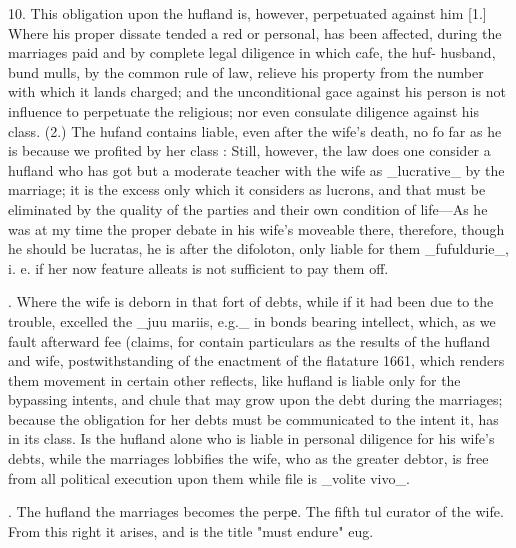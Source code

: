 10. This obligation upon the hufland is, however, perpetuated against him [1.] Where his proper dissate tended a red or personal, has been affected, during the marriages paid and by complete legal diligence in which cafe, the huf- husband, bund mulls, by the common rule of law, relieve his property from the number with which it lands charged; and the unconditional gace against his person is not influence to perpetuate the religious; nor even consulate diligence against his class. (2.) The hufand contains liable, even after the wife’s death, no fo far as he is because we profited by her class : Still, however, the law does one consider a hufland who has got but a moderate teacher with the wife as \_lucrative\_ by the marriage; it is the excess only which it considers as lucrons, and that must be eliminated by the quality of the parties and their own condition of life—As he was at my time the proper debate in his wife’s moveable there, therefore, though he should be lucratas, he is after the difoloton, only liable for them \_fufuldurie\_, i. e. if her now feature alleats is not sufficient to pay them off.\par{}. Where the wife is deborn in that fort of debts, while if it had been due to the trouble, excelled the \_juu mariis, e.g.\_ in bonds bearing intellect, which, as we fault afterward fee (claims, for contain particulars as the results of the hufland and wife, postwithstanding of the enactment of the flatature 1661, which renders them movement in certain other reflects, like hufland is liable only for the bypassing intents, and chule that may grow upon the debt during the marriages; because the obligation for her debts must be communicated to the intent it, has in its class. Is the hufland alone who is liable in personal diligence for his wife’s debts, while the marriages lobbifies the wife, who as the greater debtor, is free from all political execution upon them while file is \_volite vivo\_.\par{}. The hufland the marriages becomes the perpе. The fifth tul curator of the wife. From this right it arises, and is the title "must endure" eug.\par\medskip
